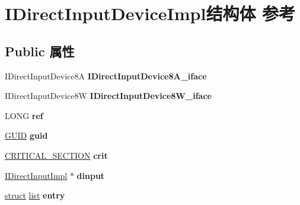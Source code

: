 \hypertarget{struct_i_direct_input_device_impl}{}\section{I\+Direct\+Input\+Device\+Impl结构体 参考}
\label{struct_i_direct_input_device_impl}
\subsection*{Public 属性}
\begin{DoxyCompactItemize}
\item 
\mbox{\label{struct_i_direct_input_device_impl_a24eab94bba3f007647a6b4e998dca878}} 
I\+Direct\+Input\+Device8A {\bfseries I\+Direct\+Input\+Device8\+A\+\_\+iface}
\item 
\mbox{\label{struct_i_direct_input_device_impl_af0db55e1194f8ce160b36e1dc575e044}} 
I\+Direct\+Input\+Device8W {\bfseries I\+Direct\+Input\+Device8\+W\+\_\+iface}
\item 
\mbox{\label{struct_i_direct_input_device_impl_abbe9089718ddf1bac8a528a6f9c2a65b}} 
L\+O\+NG {\bfseries ref}
\item 
\mbox{\label{struct_i_direct_input_device_impl_ad9a80735568ab9c28e74168d8ff635e2}} 
\hyperlink{interface_g_u_i_d}{G\+U\+ID} {\bfseries guid}
\item 
\mbox{\label{struct_i_direct_input_device_impl_a347713ff0243393ca5cca31e2b35a4d6}} 
\hyperlink{struct___c_r_i_t_i_c_a_l___s_e_c_t_i_o_n}{C\+R\+I\+T\+I\+C\+A\+L\+\_\+\+S\+E\+C\+T\+I\+ON} {\bfseries crit}
\item 
\mbox{\label{struct_i_direct_input_device_impl_a75eedcf0a1c4709af799a43f599c8772}} 
\hyperlink{struct_i_direct_input_impl}{I\+Direct\+Input\+Impl} $\ast$ {\bfseries dinput}
\item 
\mbox{\label{struct_i_direct_input_device_impl_a691db058967c2724a5cfac0ee15708fc}} 
\hyperlink{interfacestruct}{struct} \hyperlink{classlist}{list} {\bfseries entry}

\end{DoxyCompactItemize}
